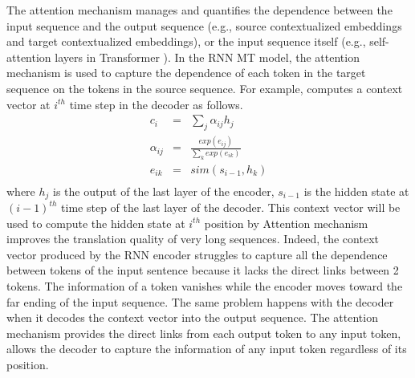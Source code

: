 The attention mechanism manages and quantifies the dependence between the input sequence and the output sequence (e.g., source contextualized embeddings and target contextualized embeddings), or the input sequence itself (e.g., self-attention layers in Transformer \citep{Vaswani17attention}). In the RNN MT model, the attention mechanism is used to capture the dependence of each token in the target sequence on the tokens in the source sequence. For example, \cite{Bahdanau15learning} computes a context vector at $i^{th}$ time step in the decoder as follows.
\begin{equation}
\begin{array}{rcl}
c_i &=& \sum_{j} \alpha_{ij} h_j \\
\alpha_{ij} &=& \frac{exp(e_{ij})}{\sum_{k}exp(e_{ik})} \\
e_{ik} &=& sim(s_{i-1},h_k)\\
\end{array}
\end{equation}
where $h_j$ is the output of the last layer of the encoder, $s_{i-1}$ is the hidden state at $(i-1)^{th}$ time step of the last layer of the  decoder. This context vector will be used to compute the hidden state at $i^{th}$ position by Attention mechanism improves the translation quality of very long sequences. Indeed, the context vector produced by the RNN encoder struggles to capture all the dependence between tokens  of the input sentence because it lacks the direct links between 2 tokens. The information of a token vanishes while the encoder moves toward the far ending of the input sequence. The same problem happens with the decoder when it decodes the context vector into the output sequence. The attention mechanism provides the direct links from each output token to any input token, allows the decoder to capture the information of any input token regardless of its position.

